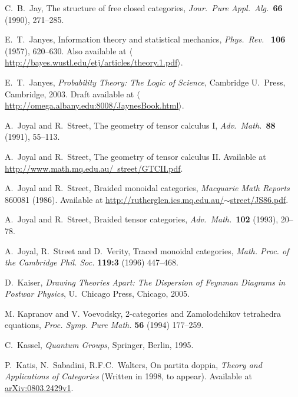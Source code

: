 \documentclass[12pt,twoside,openright]{report}
\begin{document}
\begin{thebibliography}{99}
C.\ B.\ Jay, The structure of free closed categories, 
{\sl Jour.\ Pure Appl.\ Alg.\ }{\bf 66} (1990), 271--285. 

 E.\ T.\ Janyes, Information theory and statistical mechanics, \textit{Phys.\ Rev.\ } 
\textbf{106} (1957), 620--630.  Also available at  \hfill \break
\href{http://bayes.wustl.edu/etj/articles/theory.1.pdf}
{$\langle$http://bayes.wustl.edu/etj/articles/theory.1.pdf$\rangle$}.

 E.\ T.\ Janyes, 
{\sl Probability Theory: The Logic of Science}, Cambridge U.\ Press, Cambridge, 2003. Draft available at \hfill \break
 \href{http://omega.albany.edu:8008/JaynesBook.html}
{$\langle$http://omega.albany.edu:8008/JaynesBook.html$\rangle$}.

A.\ Joyal and R.\ Street, The geometry of tensor calculus I, 
{\sl Adv.\ Math.\ }{\bf 88} (1991), 55--113.

A.\ Joyal and R.\ Street, The geometry of tensor calculus II. Available at
\hfill \break
\href{http://www.math.mq.edu.au/~street/GTCII.pdf}
{http://www.math.mq.edu.au/~street/GTCII.pdf}.

 A.\ Joyal and R.\ Street, Braided monoidal categories,
{\sl Macquarie Math Reports} 860081 (1986).  Available at
\href{http://rutherglen.ics.mq.edu.au/~street/JS86.pdf}{
http://rutherglen.ics.mq.edu.au/$\sim$street/JS86.pdf}.

A.\ Joyal and R.\ Street, Braided tensor categories,
\textsl{Adv.\ Math.\ }\textbf{102} (1993), 20--78.

 A.\ Joyal, R.\ Street and D.\ Verity, Traced monoidal categories, \textsl{Math. Proc. of the Cambridge Phil. Soc.} \textbf{119:3} (1996) 447--468.

D.\ Kaiser, \textsl{Drawing Theories Apart: The Dispersion of Feynman Diagrams in Postwar Physics}, U.\ Chicago Press, Chicago, 2005.

 M. Kapranov and V. Voevodsky, 2-categories and Zamolodchikov tetrahedra equations, \textsl{Proc. Symp. Pure Math.} \textbf{56} (1994) 177--259.

 C.\ Kassel, \textsl{Quantum Groups}, Springer, Berlin, 1995.

 P.\ Katis, N.\ Sabadini, R.F.C.\ Walters, On partita doppia, \textsl{Theory and Applications of Categories} (Written in 1998, to appear).  Available at \href{http://arxiv.org/abs/0803.2429}{arXiv:0803.2429v1}.


\end{thebibliography}
\end{document}

